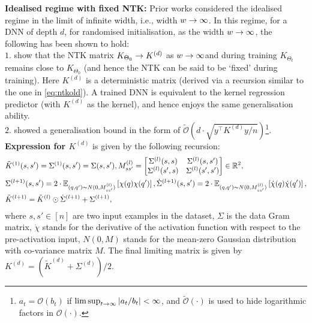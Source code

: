 \textbf{Idealised regime with fixed NTK:}
Prior works considered the idealised regime in the limit of infinite width, i.e., width $w\rightarrow\infty$. In this regime, for a DNN of depth $d$, for randomised initialisation, as the width $w\rightarrow\infty$, the following has been shown to hold:\\
$1.$ \cite{arora2019exact} show that the NTK matrix $K_{\Theta_0}\rightarrow K^{(d)}$ as $w\rightarrow\infty$and during training $K_{\Theta_t}$ remains close to $K_{\Theta_0}$ (and hence the NTK can be said to be `fixed' during training). Here $K^{(d)}$ is a deterministic matrix (derived via a recursion similar to the one in \eqref{eq:ntkold}). A trained DNN is equivalent to the kernel regression predictor (with $K^{(d)}$ as the kernel), and hence enjoys the same generalisation ability.\\
$2.$  \cite{cao2019generalization} showed a generalisation bound in the form of $\tilde{\mathcal{O}}\left(d\cdot\sqrt{y^\top K^{(d)} y/n}\right)$\footnote{$a_t=\mathcal{O}(b_t)$ if $\lim\sup_{t\rightarrow\infty}|a_t/b_t|<\infty$, and $\tilde{\mathcal{O}}(\cdot)$ is used to hide logarithmic factors in $\mathcal{O}(\cdot)$.}.\\
\textbf{Expression for $K^{(d)}$} is given by the following recursion: 
\begin{align}\label{eq:ntkold}
&\tilde{K}^{(1)}(s,s')=\Sigma^{(1)}(s,s')=\Sigma(s,s'), M^{(l)}_{ss'}=\left[\begin{matrix}\Sigma^{(l)}(s,s) & \Sigma^{(l)}(s,s')\\ \Sigma^{(l)}(s',s) & \Sigma^{(l)}(s',s')\end{matrix}\right]\in \mathbb{R}^2,\\
&\Sigma^{(l+1)}(s,s')= 2\cdot\mathbb{E}_{(q,q')\sim N(0,M_{ss'}^{(l)})} \left[\chi(q)\chi(q')\right], \dot{\Sigma}^{(l+1)}(s,s')= 2\cdot\mathbb{E}_{(q,q')\sim N(0,M_{ss'}^{(l)})}\left[\dot{\chi}(q)\dot{\chi}(q')\right],\nonumber\\
&\tilde{K}^{(l+1)}=\tilde{K}^{(l)}\odot \dot{\Sigma}^{(l+1)}+\Sigma^{(l+1)},\nonumber
\end{align}
where $s,s'\in[n]$ are two input examples in the dataset, $\Sigma$ is the data Gram matrix, $\dot{\chi}$ stands for the derivative of the activation function with respect to the pre-activation input, $N(0,M)$ stands for the mean-zero Gaussian distribution with co-variance matrix $M$. The final limiting matrix is given by $K^{(d)}=\left(\tilde{K}^{(d)}+\Sigma^{(d)}\right)/2$. 

